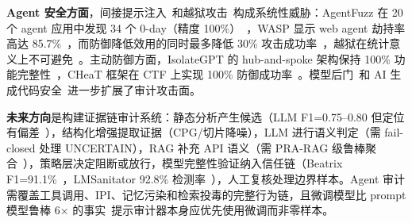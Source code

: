 \documentclass[11pt,a4paper,onecolumn]{article}
\begin{document}
\textbf{Agent 安全方面}，间接提示注入~\cite{zhan2024injecagent,liu2024promptinjbench}和越狱攻击~\cite{deng2024masterkey,gong2025papillon}构成系统性威胁：AgentFuzz 在 20 个 agent 应用中发现 34 个 0-day（精度 100\%）~\cite{liu2025taintstyle}，WASP 显示 web agent 劫持率高达 85.7\%~\cite{evtimov2025wasp}，而防御降低效用的同时最多降低 30\% 攻击成功率~\cite{zhang2024asb}，越狱在统计意义上不可避免~\cite{su2024missionimpossible}。主动防御方面，IsolateGPT 的 hub-and-spoke 架构保持 100\% 功能完整性~\cite{wu2025isolateGpt}，CHeaT 框架在 CTF 上实现 100\% 防御成功率~\cite{ayzenshteyn2025cloak}。模型后门~\cite{wei2024lmsanitator,zhang2024instrbackdoor}和 AI 生成代码安全~\cite{pearce2023copilot_correctness,trust_copilot2025}进一步扩展了审计攻击面。

\textbf{未来方向}是构建证据链审计系统：静态分析产生候选（LLM F1=0.75--0.80 但定位有偏差~\cite{gnnic2024}），结构化增强提取证据（CPG/切片降噪），LLM 进行语义判定（需 fail-closed 处理 UNCERTAIN），RAG 补充 API 语义（需 PRA-RAG 级鲁棒聚合~\cite{tan2026prarag}），策略层决定阻断或放行，模型完整性验证纳入信任链（Beatrix F1=91.1\%~\cite{li2023beatrix}，LMSanitator 92.8\% 检测率~\cite{wei2024lmsanitator}），人工复核处理边界样本。Agent 审计需覆盖工具调用、IPI、记忆污染和检索投毒的完整行为链，且微调模型比 prompt 模型鲁棒 6$\times$ 的事实~\cite{zhan2024injecagent}提示审计器本身应优先使用微调而非零样本。

\begin{center}
\end{center}

\appendix
\end{document}
